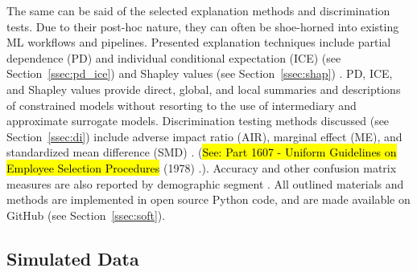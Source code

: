 \documentclass[information,article,accept,moreauthors,pdftex]{Definitions/mdpi}
\begin{document}
{{The same can be said of the selected explanation methods and discrimination tests. Due to their post-hoc nature, they can often be shoe-horned into existing ML workflows and pipelines. Presented explanation techniques include partial dependence (PD) and individual conditional expectation (ICE) (see Section~\ref{ssec:pd_ice}) and Shapley values (see Section~\ref{ssec:shap}) \cite{esl,ice_plots,shapley,tree_shap}. PD, ICE, and Shapley values provide direct, global, and local summaries and descriptions of constrained models without resorting to the use of intermediary and approximate surrogate models. Discrimination testing methods discussed (see Section~\ref{ssec:di}) include adverse impact ratio (AIR), marginal effect (ME), and standardized mean difference (SMD)  \cite{feldman2015certifying,cohen1988statistical,cohen1992power}. ({\hl{See: Part 1607 - Uniform Guidelines on Employee Selection Procedures} (1978) .}).
 Accuracy and other confusion matrix measures are also reported by demographic segment \cite{zafar2017fairness}. All outlined materials and methods are implemented in open source Python code, and are made available on GitHub (see Section~\ref{ssec:soft}). 


\subsection{Simulated Data}\label{ssec:sim_data}

}}
\end{document}

